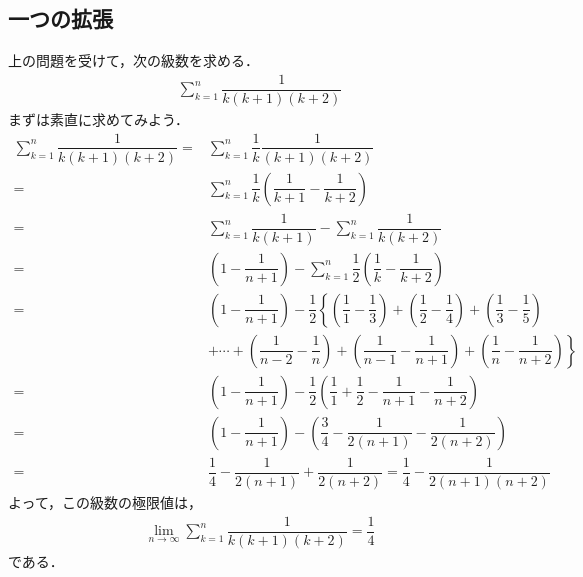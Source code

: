 \documentclass[12pt]{jsarticle}
\begin{document}
\subsection*{一つの拡張}
上の問題を受けて，次の級数を求める．
\begin{align*}
\sum_{k=1}^{n} \dfrac{1}{k(k+1)(k+2)}
\end{align*}
まずは素直に求めてみよう．
\begin{align*}
\sum_{k=1}^{n} \dfrac{1}{k(k+1)(k+2)} =& \sum_{k=1}^{n} \dfrac{1}{k}\dfrac{1}{(k+1)(k+2)} \\
=&\sum_{k=1}^{n} \dfrac{1}{k} \left( \dfrac{1}{k+1} - \dfrac{1}{k+2} \right) \\
=&\sum_{k=1}^{n} \dfrac{1}{k(k+1)} - \sum_{k=1}^{n} \dfrac{1}{k(k+2)} \\
=&\left( 1- \dfrac{1}{n+1} \right) - \sum_{k=1}^{n} \dfrac{1}{2} \left( \dfrac{1}{k} - \dfrac{1}{k+2} \right) \\
=&\left( 1- \dfrac{1}{n+1} \right) - \dfrac{1}{2} \left\{ \left( \dfrac{1}{1} - \dfrac{1}{3} \right)  + \left( \dfrac{1}{2} - \dfrac{1}{4} \right) + \left( \dfrac{1}{3} - \dfrac{1}{5} \right) \right. \\
&\left.  + \cdots + \left( \dfrac{1}{n-2} - \dfrac{1}{n} \right) + \left( \dfrac{1}{n-1} - \dfrac{1}{n+1} \right) + \left( \dfrac{1}{n} - \dfrac{1}{n+2} \right) \right\} \\
=& \left( 1 - \dfrac{1}{n+1} \right) - \dfrac{1}{2} \left( \dfrac{1}{1} + \dfrac{1}{2} - \dfrac{1}{n+1} - \dfrac{1}{n+2} \right) \\
=& \left( 1 - \dfrac{1}{n+1} \right) - \left( \dfrac{3}{4} - \dfrac{1}{2(n+1)} - \dfrac{1}{2(n+2)} \right) \\
=& \dfrac{1}{4} - \dfrac{1}{2(n+1)} + \dfrac{1}{2(n+2)}  = \dfrac{1}{4} - \dfrac{1}{2(n+1)(n+2)}
\end{align*}
よって，この級数の極限値は，
\begin{align*}
\lim_{n \to \infty}\sum_{k=1}^{n} \dfrac{1}{k(k+1)(k+2)} = \dfrac{1}{4}
\end{align*}
である．
\end{document}
